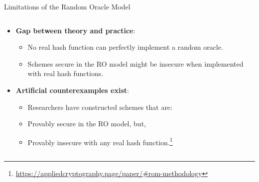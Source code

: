 \documentclass[aspectratio=169, lualatex, handout]{beamer}
\begin{document}
\begin{frame}{Limitations of the Random Oracle Model}
	\begin{columns}
		\begin{column}{1\textwidth}
			\begin{itemize}
				\item \textbf{Gap between theory and practice}:
				      \begin{itemize}
					      \item No real hash function can perfectly implement a random oracle.
					      \item Schemes secure in the RO model might be insecure when implemented with real hash functions.
				      \end{itemize}
				\item \textbf{Artificial counterexamples exist}:
				      \begin{itemize}
					      \item Researchers have constructed schemes that are:
					      \item Provably secure in the RO model, but,
					      \item Provably insecure with any real hash function.\footnote{\url{https://appliedcryptography.page/paper/\#rom-methodology}}
				      \end{itemize}
			\end{itemize}
		\end{column}
	\end{columns}
\end{frame}

\begin{frame}[plain]
	\titlepage
\end{frame}
\end{document}
